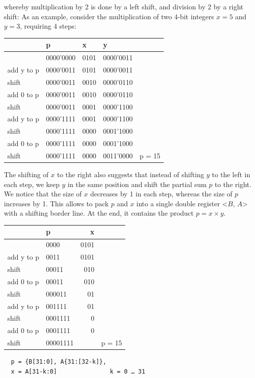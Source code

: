 whereby multiplication by 2 is done by a left shift, and division by 2 by a right shift: As an example,
consider the multiplication of two 4-bit integers $x = 5$ and $y = 3$, requiring 4 steps:
\begin{table}[h!]
  \centering
  \begin{tabular}{l l l l l}
               & p         & x    & y         \\\hline
               & 0000'0000 & 0101 & 0000'0011 \\
    add y to p & 0000'0011 & 0101 & 0000'0011 \\
    shift      & 0000'0011 & 0010 & 0000'0110 \\
    add 0 to p & 0000'0011 & 0010 & 0000'0110 \\
    shift      & 0000'0011 & 0001 & 0000'1100 \\
    add y to p & 0000'1111 & 0001 & 0000'1100 \\
    shift      & 0000'1111 & 0000 & 0001'1000 \\
    add 0 to p & 0000'1111 & 0000 & 0001'1000 \\
    shift      & 0000'1111 & 0000 & 0011'0000 & p = 15
  \end{tabular}
\end{table}

The shifting of $x$ to the right also suggests that instead of shifting $y$ to the left in each step, we
keep $y$ in the same position and shift the partial sum $p$ to the right. We notice that the size of $x$
decreases by 1 in each step, whereas the size of $p$ increases by 1. This allows to pack $p$ and $x$
into a single double register <$B$, $A$> with a shifting border line. At the end, it contains the product $p
= x × y$.

\begin{table}[h!]
  \centering
  \begin{tabular}{l l r l}
               & p        &    x \\\hline
               & 0000     & 0101 \\
    add y to p & 0011     & 0101 \\
    shift      & 00011    &  010 \\
    add 0 to p & 00011    &  010 \\
    shift      & 000011   &   01 \\
    add y to p & 001111   &   01 \\
    shift      & 0001111  &    0 \\
    add 0 to p & 0001111  &    0 \\
    shift      & 00001111 &      & p = 15
  \end{tabular}
\end{table}
\begin{verbatim}
  p = {B[31:0], A{31:[32-k]},
  x = A[31-k:0]               k = 0 … 31
\end{verbatim}

